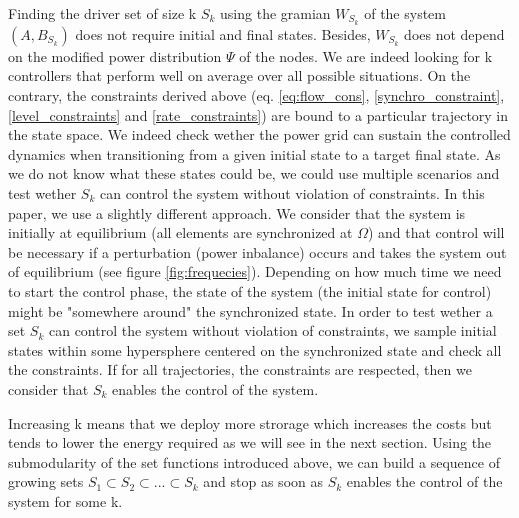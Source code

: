 \documentclass[conference]{IEEEtran}
\begin{document}
Finding the driver set of size k $S_k$ using the gramian $W_{S_k}$ of the system $(A,B_{S_k})$ does not require initial and final states. Besides, $W_{S_k}$ does not depend on the modified power distribution $ \Psi $ of the nodes. We are indeed looking for k controllers that perform well on average over all possible situations. On the contrary, the constraints derived above (eq. \ref{eq:flow_cons}, \ref{synchro_constraint}, \ref{level_constraints} and \ref{rate_constraints}) are bound to a particular trajectory in the state space. We indeed check wether the power grid can sustain the controlled dynamics when transitioning from a given initial state to a target final state. As we do not know what these states could be, we could use multiple scenarios and test wether $S_k$ can control the system without violation of constraints. In this paper, we use a slightly different approach. We consider that the system is initially at equilibrium (all elements are synchronized at $\Omega$) and that control will be necessary if a perturbation (power inbalance) occurs and takes the system out of equilibrium (see figure \ref{fig:frequecies}). Depending on how much time we need to start the control phase, the state of the system (the initial state for control) might be "somewhere around" the synchronized state. In order to test wether a set $S_k$ can control the system without violation of constraints, we sample initial states within some hypersphere centered on the synchronized state and check all the constraints. If for all trajectories, the constraints are respected, then we consider that $S_k$ enables the control of the system.

Increasing k means that we deploy more strorage which increases the costs but tends to lower the energy required as we will see in the next section. Using the submodularity of the set functions introduced above, we can build a sequence of growing sets $S_1 \subset S_2 \subset ... \subset S_k $ and stop as soon as $S_k$ enables the control of the system for some k.

\end{document}
